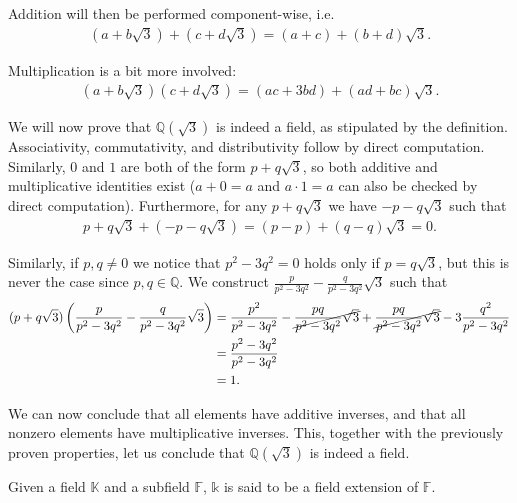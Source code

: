 \begin{exmp}
  Addition will then be performed component-wise, i.e. 
  \begin{align*}
  (a + b \sqrt 3) + (c + d \sqrt 3) = (a + c)  + (b + d) \sqrt 3.
  \end{align*}

  Multiplication is a bit more involved:
  \begin{align*}
    (a + b \sqrt 3)(c + d \sqrt 3) = (ac + 3bd) + (ad + bc) \sqrt 3.
  \end{align*}

  We will now prove that $ \mathbb{Q}(\sqrt{3})$ is indeed a field, as stipulated by the definition. Associativity,  commutativity, and distributivity follow by direct computation. Similarly, $0$ and $1$ are both of the form $p + q \sqrt 3$, so both additive and multiplicative identities exist ($a + 0 = a$ and $a \cdot 1 = a$ can also be checked by direct computation). Furthermore, for any $p + q \sqrt 3$ we have $-p -q \sqrt 3$ such that 
  \begin{align*}
    p + q\sqrt 3 + (- p - q\sqrt 3) = (p - p) + (q - q) \sqrt 3 = 0.
  \end{align*}

  Similarly, if $p, q \neq 0$ we notice that $p ^2 - 3 q ^2 = 0$ holds only if $p = q \sqrt 3$, but this is never the case since $p, q \in \mathbb{Q}$. We construct $\frac p {p ^2 - 3 q ^2 } - \frac q {p ^2 - 3 q ^2 } \sqrt 3$ such that
  \begin{align*}
    (p + q \sqrt 3)\left(\frac p {p ^2 - 3 q ^2 } - \frac q {p ^2 - 3 q ^2 } \sqrt 3\right)
    &= \frac {p ^2}  {p ^2 - 3 q ^2 } - \cancel{\frac {pq} {p ^2 - 3 q ^2 } \sqrt 3}
    + \cancel{\frac {pq}  {p ^2 - 3 q ^2 } \sqrt 3} - 3\frac {q ^2 } {p ^2 - 3 q ^2 }
    \\&= \frac{p ^2 - 3 q ^2 }{p ^2 - 3 q ^2 }
    \\&= 1.
  \end{align*}

  We can now conclude that all elements have additive inverses, and that all nonzero elements have multiplicative inverses. This, together with the previously proven properties, let us conclude that $\mathbb{Q} (\sqrt{3})$ is indeed a field.
\end{exmp}

\begin{defn}
 Given a field $\mathbb{K}$ and a subfield $\mathbb{F}$, $\mathbb{k}$ is said to be a field extension of $\mathbb{F}$.
\end{defn}

